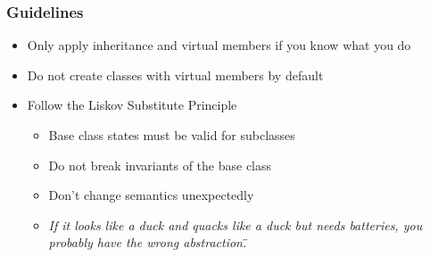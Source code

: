\subsubsection{Guidelines}
\begin{itemize}
    \item Only apply inheritance and virtual members if you know what you do
    \item Do not create classes with virtual members by default
    \item Follow the Liskov Substitute Principle
    \begin{itemize}
        \item Base class states must be valid for subclasses
        \item Do not break invariants of the base class
        \item Don't change semantics unexpectedly
        \item \textit{If it looks like a duck and quacks like a duck but needs batteries, you probably have the wrong abstraction.\"}
    \end{itemize}
\end{itemize}
